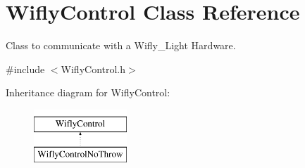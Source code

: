 \hypertarget{class_wifly_control}{\section{Wifly\-Control Class Reference}
\label{class_wifly_control}
}


Class to communicate with a Wifly\-\_\-\-Light Hardware.  




{\ttfamily \#include $<$Wifly\-Control.\-h$>$}

Inheritance diagram for Wifly\-Control\-:\begin{figure}[H]
\begin{center}
\leavevmode
\includegraphics[height=2.000000cm]{class_wifly_control}
\end{center}
\end{figure}
